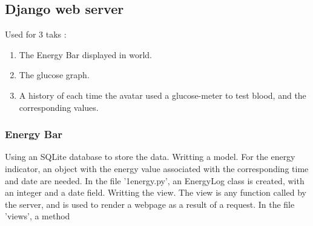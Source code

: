 \subsection{Django web server}
Used for 3 taks : 
\begin{enumerate}
\item The Energy Bar displayed in world. 
\item The glucose graph.
\item A history of each time the avatar used a glucose-meter to test blood, and the corresponding  values.
\end{enumerate}

\subsubsection{Energy Bar}
Using an SQLite database to store the data.
Writting a model. For the energy indicator, an object with the energy value associated with the corresponding time and date are needed. In the file '1energy.py', an EnergyLog class is created, with an integer and a date field.
Writting the view. The view is any function called by the server, and is used to render a webpage as a result of a request. In the file 'views', a method 